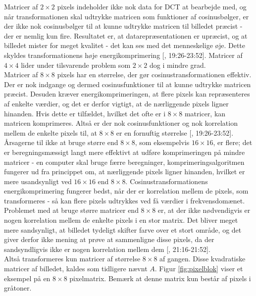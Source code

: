 Matricer af $2\times2$ pixels indeholder ikke nok data for DCT at bearbejde med, og når transformationen skal udtrykke matricen som funktioner af cosinusbølger, er der ikke nok cosinusbølger til at kunne udtrykke matricen til billedet præcist - der er nemlig kun fire. Resultatet er, at datarepræsentationen er upræcist, og at billedet mister for meget kvalitet - det kan ses med det menneskelige øje. Dette skyldes transformationens høje energikomprimering [\citet{guillermo_sapiro}, 19:26-23:52]. Matricer af $4\times4$ lider under tilsvarende problem som $2\times2$ dog i mindre grad.\\
Matricer af $8\times8$ pixels har en størrelse, der gør cosinustransformationen effektiv. Der er nok indgange og dermed cosinusfunktioner til at kunne udtrykke matricen præcist. Desuden kræver energikomprimeringen, at flere pixels kan repræsenteres af enkelte værdier, og det er derfor vigtigt, at de nærliggende pixels ligner hinanden. Hvis dette er tilfældet, hvilket det ofte er i $8 \times 8$ matricer, kan matricen komprimeres. Altså er der nok cosinusfunktioner og nok korrelation mellem de enkelte pixels til, at $8 \times 8$ er en fornuftig størrelse [\citet{guillermo_sapiro}, 19:26-23:52].\\
Årsagerne til ikke at bruge større end $8 \times 8$, som eksempelvis $16\times16$, er flere; det er beregningsmæssigt langt mere effektivt at udføre komprimeringen på mindre matricer - en computer skal bruge færre beregninger, komprimeringsalgoritmen fungerer ud fra princippet om, at nærliggende pixels ligner hinanden, hvilket er mere usandsynligt ved $16 \times 16$ end $8 \times 8$. Cosinustransformationens energikomprimering fungerer bedst, når der er korrelation mellem de pixels, som transformeres - så kan flere pixels udtrykkes ved få værdier i frekvensdomænet. Problemet med at bruge større matricer end $8\times8$ er, at der ikke nødvendigvis er nogen korrelation mellem de enkelte pixels i en stor matrix. Det bliver meget mere sandsynligt, at billedet tydeligt skifter farve over et stort område, og det giver derfor ikke mening at prøve at sammenligne disse pixels, da der sandsyndligvis ikke er nogen korrelation mellem dem [\citet{guillermo_sapiro}, 21:16-21:52].\\
Altså transformeres kun matricer af størrelse $8\times8$ af gangen. Disse kvadratiske matricer af billedet, kaldes som tidligere nævnt $A$. Figur \vref{fig:pixelblok} viser et eksempel på en $8 \times 8$ pixelmatrix. Bemærk at denne matrix kun består af pixels i gråtoner.

